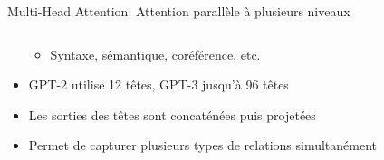 \documentclass[aspectratio=169]{beamer}
\begin{document}
\begin{frame}{Multi-Head Attention: Attention parallèle à plusieurs niveaux}
\begin{columns}
\begin{column}{0.6\textwidth}
\begin{itemize}
                \begin{itemize}
                    \item Syntaxe, sémantique, coréférence, etc.
                \end{itemize}
                \item GPT-2 utilise 12 têtes, GPT-3 jusqu'à 96 têtes
                \item Les sorties des têtes sont concaténées puis projetées
                \item Permet de capturer plusieurs types de relations simultanément
            \end{itemize}
        \end{column}
    \end{columns}
\end{frame}
\end{document}
